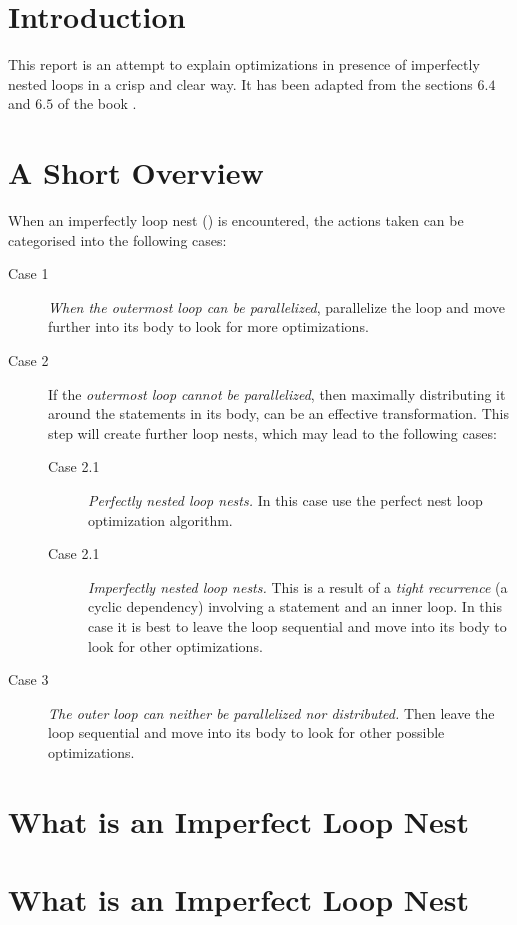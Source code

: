 \section{Introduction}
This report is an attempt to explain optimizations in presence of imperfectly nested loops in a crisp and clear way. It has been adapted from the sections $6.4$ and $6.5$ of the book .

\section{A Short Overview}
When an imperfectly loop nest () is encountered, the actions taken can be categorised into the following cases:
\begin{description}
    \item[Case 1] \emph{When the outermost loop can be parallelized}, parallelize the loop and move further into its body to look for more optimizations.
    \item[Case 2] If the \emph{outermost loop cannot be parallelized}, then maximally distributing it around the statements in its body, can be an effective transformation. This step will create further loop nests, which may lead to the following cases:
        \begin{description}
        \item[Case 2.1] \emph{Perfectly nested loop nests.} In this case use the perfect nest loop optimization algorithm.
        \item[Case 2.1] \emph{Imperfectly nested loop nests.} This is a result of a \emph{tight recurrence} (a cyclic dependency) involving a statement and an inner loop. In this case it is best to leave the loop sequential and move into its body to look for other optimizations.
        \end{description}
    \item[Case 3] \emph{The outer loop can neither be parallelized nor distributed.} Then leave the loop sequential and move into its body to look for other possible optimizations.

\end{description}

\section{What is an Imperfect Loop Nest}\label{sec:imperfectloops}

\section{What is an Imperfect Loop Nest}
